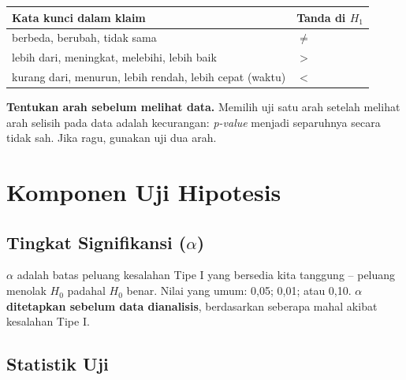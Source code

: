 \documentclass[
  indonesian,
  letterpaper,
]{book}
\newcounter{none} %
\begin{document}
{\def\LTcaptype{none} %
\begin{longtable}[]{@{}ll@{}}
\toprule\noalign{}
Kata kunci dalam klaim & Tanda di \(H_1\) \\
\midrule\noalign{}
\endhead
\bottomrule\noalign{}
\endlastfoot
berbeda, berubah, tidak sama & \(\ne\) \\
lebih dari, meningkat, melebihi, lebih baik & \(>\) \\
kurang dari, menurun, lebih rendah, lebih cepat (waktu) & \(<\) \\
\end{longtable}
}

\begin{tcolorbox}[enhanced jigsaw, arc=.35mm, bottomrule=.15mm, bottomtitle=1mm, breakable, colback=white, colbacktitle=quarto-callout-warning-color!10!white, colframe=quarto-callout-warning-color-frame, coltitle=black, left=2mm, leftrule=.75mm, opacityback=0, opacitybacktitle=0.6, rightrule=.15mm, title=\textcolor{quarto-callout-warning-color}{\faExclamationTriangle}\hspace{0.5em}{Peringatan}, titlerule=0mm, toprule=.15mm, toptitle=1mm]

\textbf{Tentukan arah sebelum melihat data.} Memilih uji satu arah
setelah melihat arah selisih pada data adalah kecurangan: \emph{p-value}
menjadi separuhnya secara tidak sah. Jika ragu, gunakan uji dua arah.

\end{tcolorbox}


\chapter{Komponen Uji Hipotesis}\label{komponen-uji-hipotesis}

\section{\texorpdfstring{Tingkat Signifikansi
(\(\alpha\))}{Tingkat Signifikansi (\textbackslash alpha)}}\label{tingkat-signifikansi-alpha}

\(\alpha\) adalah batas peluang kesalahan Tipe I yang bersedia kita
tanggung -- peluang menolak \(H_0\) padahal \(H_0\) benar. Nilai yang
umum: 0,05; 0,01; atau 0,10. \(\alpha\) \textbf{ditetapkan sebelum data
dianalisis}, berdasarkan seberapa mahal akibat kesalahan Tipe I.

\section{Statistik Uji}\label{statistik-uji}
\end{document}
